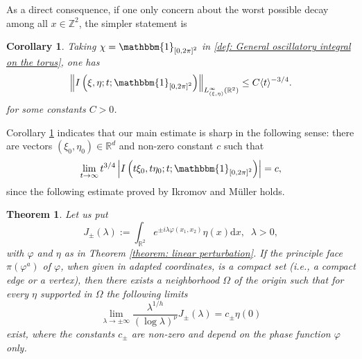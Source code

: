 \documentclass[12pt]{amsart}
\newtheorem{theorem}{Theorem}[section]
\newtheorem{corollary}{Corollary}[section]
\newcommand\JP[1]{\langle#1\rangle}
\newcommand\norm[1]{\left\|#1\right\|}
\newcommand{\R}{\mathbb{R}}
\newcommand{\Z}{\mathbb{Z}}
\def\d{\mathrm{d}}
\begin{document}
As a direct consequence, if one only concern about the worst possible decay among all $x\in\Z^{2}$, the simpler statement is 
\begin{corollary}\label{coro: sharp decay-R^2}
   Taking $\chi=\mathbbm{1}_{\left[0,2\pi\right]^{2}}$ in \eqref{def: General oscillatory integral on the torus}, one has
   \begin{equation*}
       \norm{I\left(\xi,\eta;t;\mathbbm{1}_{\left[0,2\pi\right]^{2}}\right)}_{L^{\infty}_{\left(\xi,\eta\right)}\left(\R^{2}\right)}\leq C\JP{t}^{-3/4}.
   \end{equation*}
   for some constants $C>0$.
\end{corollary}

Corollary \ref{coro: sharp decay-R^2} indicates that our main estimate is sharp in the following sense: there are vectors $\left(\xi_{0},\eta_{0}\right)\in \R^d$ and non-zero constant $c$ such that 
\begin{equation}\label{sharp}
    \lim_{t\to\infty}t^{3/4}\left|I\left(t\xi_{0},t\eta_{0};t;\mathbbm{1}_{\left[0,2\pi\right]^{2}}\right)\right|=c,
\end{equation} since the following estimate proved by Ikromov and M\"uller holds.
\begin{theorem}\cite[Theorem 1.3]{IM11}\label{theorem: sharpness}
    Let us put 
    \begin{equation*}
        J_{\pm}\left(\lambda\right):=\int_{\R^{2}}e^{\pm i\lambda\varphi\left(x_{1},x_{2}\right)}\eta\left(x\right)\d x,\;\;\lambda>0,
    \end{equation*}
    with $\varphi$ and $\eta$ as in Theorem \ref{theorem: linear perturbation}. If the principle face $\pi\left(\varphi^{a}\right)$ of $\varphi$, when given in adapted coordinates, is a compact set (i.e., a compact edge or a vertex), then there exists a neighborhood $\Omega$ of the origin such that for every $\eta$ supported in $\Omega$ the following limits
    \begin{equation*}
        \lim_{\lambda\to\pm\infty}\frac{\lambda^{1/h}}{\left(\log\lambda\right)^{\nu}}J_{\pm}\left(\lambda\right)=c_{\pm}\eta\left(0\right)
    \end{equation*}
    exist, where the constants $c_{\pm}$ are non-zero and depend on the phase function $\varphi$ only.
\end{theorem}
\end{document}

